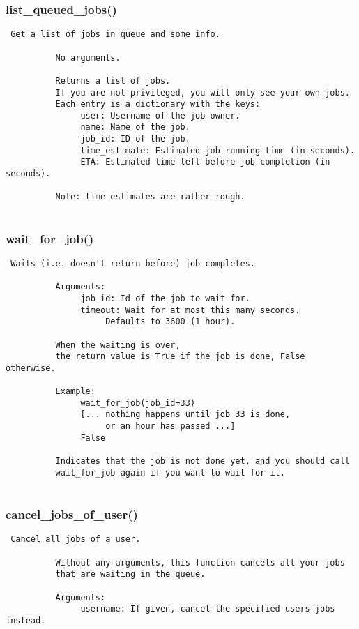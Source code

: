 \subsubsection{list\_queued\_jobs()}


\begin{verbatim}
 Get a list of jobs in queue and some info.

          No arguments.

          Returns a list of jobs.
          If you are not privileged, you will only see your own jobs.
          Each entry is a dictionary with the keys:
               user: Username of the job owner.
               name: Name of the job.
               job_id: ID of the job.
               time_estimate: Estimated job running time (in seconds).
               ETA: Estimated time left before job completion (in seconds).

          Note: time estimates are rather rough.
          
\end{verbatim}
\subsubsection{wait\_for\_job()}


\begin{verbatim}
 Waits (i.e. doesn't return before) job completes.
     
          Arguments:
               job_id: Id of the job to wait for.
               timeout: Wait for at most this many seconds.
                    Defaults to 3600 (1 hour).
          
          When the waiting is over, 
          the return value is True if the job is done, False otherwise. 
          
          Example:
               wait_for_job(job_id=33)
               [... nothing happens until job 33 is done,
                    or an hour has passed ...]
               False

          Indicates that the job is not done yet, and you should call
          wait_for_job again if you want to wait for it.
          
\end{verbatim}
\subsubsection{cancel\_jobs\_of\_user()}


\begin{verbatim}
 Cancel all jobs of a user.
          
          Without any arguments, this function cancels all your jobs
          that are waiting in the queue.

          Arguments:
               username: If given, cancel the specified users jobs instead. 
\end{verbatim}
